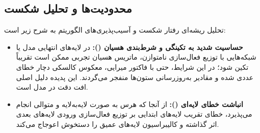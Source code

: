 \subsection{محدودیت‌ها و تحلیل شکست}
تحلیل ریشه‌ای رفتار شکست و آسیب‌پذیری‌های الگوریتم  به شرح زیر است:
\begin{itemize}
    \item \textbf{حساسیت شدید به تکینگی و شرط‌بندی هسیان ():} در لایه‌های انتهایی مدل یا شبکه‌هایی با توزیع فعال‌سازی نامتوازن، ماتریس هسیان تجربی ممکن است تقریباً تکین شود؛ در این شرایط، حتی با فاکتور میرایی، معکوس کالسکی دچار خطای عددی شده و مقادیر به‌روزرسانی ستون‌ها منفجر می‌گردند. این پدیده دلیل اصلی افت دقت در مدل  است.
    \item \textbf{انباشت خطای لایه‌ای ():} از آنجا که هرس به صورت لایه‌به‌لایه و متوالی انجام می‌پذیرد، خطای تقریب لایه‌های ابتدایی بر توزیع فعال‌سازی ورودی لایه‌های بعدی اثر گذاشته و کالیبراسیون لایه‌های عمیق را دستخوش اعوجاج می‌کند.
\end{itemize}
